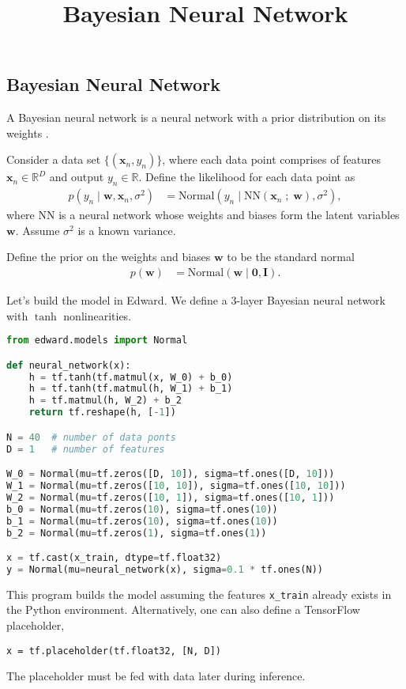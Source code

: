 \title{Bayesian Neural Network}

\subsection{Bayesian Neural Network}

A Bayesian neural network is a neural network with a prior
distribution on its weights \citep{neal2012bayesian}.

Consider a data set $\{(\mathbf{x}_n, y_n)\}$, where each data point
comprises of features $\mathbf{x}_n\in\mathbb{R}^D$ and output
$y_n\in\mathbb{R}$. Define the likelihood for each data point as
\begin{align*}
  p(y_n \mid \mathbf{w}, \mathbf{x}_n, \sigma^2)
  &=
  \text{Normal}(y_n \mid \mathrm{NN}(\mathbf{x}_n\;;\;\mathbf{w}), \sigma^2),
\end{align*}
where $\mathrm{NN}$ is a neural network whose weights and biases form
the latent variables $\mathbf{w}$. Assume $\sigma^2$ is a
known variance.

Define the prior on the weights and biases $\mathbf{w}$ to be the standard normal
\begin{align*}
  p(\mathbf{w})
  &=
  \text{Normal}(\mathbf{w} \mid \mathbf{0}, \mathbf{I}).
\end{align*}

Let's build the model in Edward. We define a 3-layer Bayesian neural
network with $\tanh$ nonlinearities.
\begin{lstlisting}[language=Python]
from edward.models import Normal

def neural_network(x):
    h = tf.tanh(tf.matmul(x, W_0) + b_0)
    h = tf.tanh(tf.matmul(h, W_1) + b_1)
    h = tf.matmul(h, W_2) + b_2
    return tf.reshape(h, [-1])

N = 40  # number of data ponts
D = 1   # number of features

W_0 = Normal(mu=tf.zeros([D, 10]), sigma=tf.ones([D, 10]))
W_1 = Normal(mu=tf.zeros([10, 10]), sigma=tf.ones([10, 10]))
W_2 = Normal(mu=tf.zeros([10, 1]), sigma=tf.ones([10, 1]))
b_0 = Normal(mu=tf.zeros(10), sigma=tf.ones(10))
b_1 = Normal(mu=tf.zeros(10), sigma=tf.ones(10))
b_2 = Normal(mu=tf.zeros(1), sigma=tf.ones(1))

x = tf.cast(x_train, dtype=tf.float32)
y = Normal(mu=neural_network(x), sigma=0.1 * tf.ones(N))
\end{lstlisting}
This program builds the model assuming the features \texttt{x\_train}
already exists in the Python environment. Alternatively, one can also
define a TensorFlow placeholder,
\begin{lstlisting}
x = tf.placeholder(tf.float32, [N, D])
\end{lstlisting}
The placeholder must be fed with data later during inference.


